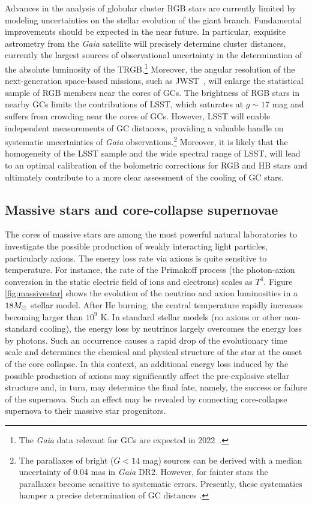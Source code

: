 Advances in the analysis of globular cluster RGB stars are currently limited by modeling uncertainties on the stellar evolution of the giant branch.
Fundamental improvements should be expected in the near future. 
In particular, exquisite astrometry from the {\it Gaia} satellite will precisely determine cluster distances, currently the largest sources of observational uncertainty in the determination of the absolute luminosity of the TRGB.\footnote{The {\it Gaia} data relevant for GCs are expected in 2022~\citep{Gaia}.}
Moreover, the angular resolution of the next-generation space-based missions, such as JWST~\citep{Gardner:2006ky}, will enlarge the statistical sample of RGB members near the cores of GCs. 
The brightness of RGB stars in nearby GCs limits the contributions of LSST, which saturates at $g \sim 17$ mag and suffers from crowding near the cores of GCs.
However, LSST will enable independent measurements of GC distances, providing a valuable handle on systematic uncertainties of {\it Gaia} observations.\footnote{The parallaxes of bright ($G<14$ mag) sources can be derived with a median uncertainty of 0.04 mas in {\it Gaia} DR2. However, for fainter stars the parallaxes become sensitive to systematic errors.  Presently, these systematics hamper a precise determination of GC distances \citep{Chen:2018}.}
Moreover, it is likely that the homogeneity of the LSST sample and the wide spectral range of LSST, will lead to an optimal calibration of the bolometric corrections for RGB and HB stars and ultimately contribute to a more clear assessment of the cooling of GC stars.


\subsection{Massive stars and core-collapse supernovae}

The cores of massive stars are among the most powerful natural laboratories to investigate the possible production of weakly interacting light particles, particularly axions. 
The energy loss rate via axions is quite sensitive to temperature. 
For instance, the rate of the Primakoff process (the photon-axion conversion in the static electric field of ions and electrons) scales as $T^4$. 
Figure \ref{fig:massivestar} shows the evolution of the neutrino and axion luminosities in a $18M_\odot$ stellar model. 
After He burning, the central temperature rapidly increases becoming larger than $10^9$ K. 
In standard stellar models (no axions or other non-standard cooling), the energy loss by neutrinos largely overcomes the energy loss by photons. Such an occurrence causes a rapid drop of the evolutionary time scale and determines the chemical and physical structure of the star at the onset of the core collapse. 
In this context, an additional energy loss induced by the possible production of axions may significantly affect the pre-explosive stellar structure and, in turn, may determine the final fate, namely, the success or failure of the supernova. 
Such an effect may be revealed by connecting core-collapse supernova to their massive star progenitors.

